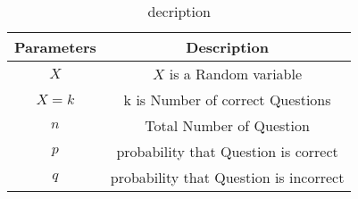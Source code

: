 \begin{table}[H]
\centering
\def\arraystretch{1.5}
\begin{tabular}{|c|c|}
\hline
\textbf{Parameters} & \textbf{Description} \\ \hline 
$X$ & $X$ is a Random variable \\ \hline
$X=k$ & k is Number of correct Questions \\ \hline
$n$ & Total Number of Question \\ \hline
$p$ & probability that Question is correct \\ \hline
$q$ & probability that Question is incorrect \\ \hline
\end{tabular}
\label{tab: table 1}
\caption{decription}
\end{table}

